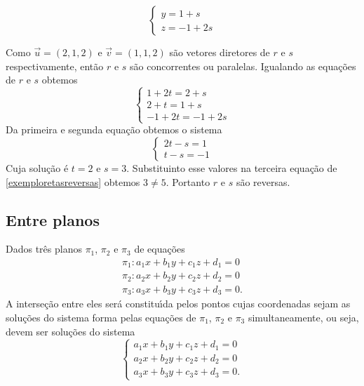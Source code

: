 \begin{exemplos}
\begin{enumerate}
\[\begin{cases}
                y = 1 + s\\
                z = -1 + 2s
            \end{cases}
        \]
        \begin{solucao}
            Como $\vec{u} = (2,1,2)$ e $\vec{v} = (1,1,2)$ s\~ao vetores diretores de $r$ e $s$ respectivamente, ent\~ao $r$ e $s$ s\~ao concorrentes ou paralelas. Igualando as equa\c{c}\~oes de $r$ e $s$ obtemos
            \begin{equation}\label{exemploretasreversas}
                \begin{cases}
                    1 + 2t = 2 + s\\
                    2 + t = 1 + s\\
                    -1 + 2t = -1 + 2s    
                \end{cases}
            \end{equation}
            Da primeira e segunda equação obtemos o sistema
            \[
                \begin{cases}
                    2t - s = 1\\
                    t - s = -1
                \end{cases}
            \]
            Cuja solução é $t = 2$ e $s = 3$. Substituinto esse valores na terceira equação de \eqref{exemploretasreversas} obtemos $3 \ne 5$. Portanto $r$ e $s$ s\~ao reversas.
        \end{solucao}
    \end{enumerate}
\end{exemplos}

\subsection{Entre planos} %
\label{sub:entre_planos}
Dados tr\^es planos $\pi_1$, $\pi_2$ e $\pi_3$ de equa\c{c}\~oes
\begin{align*}
    \pi_1 : a_1x + b_1y + c_1z + d_1 = 0\\
    \pi_2 : a_2x + b_2y + c_2z + d_2 = 0\\
    \pi_3 : a_3x + b_3y + c_3z + d_3 = 0.
\end{align*}
A interse\c{c}\~ao entre eles ser\'a constitu{\'\i}da pelos pontos cujas coordenadas sejam as solu\c{c}\~oes do sistema forma pelas equa\c{c}\~oes de $\pi_1$, $\pi_2$ e $\pi_3$ simultaneamente, ou seja, devem ser solu\c{c}\~oes do sistema
\[
    \begin{cases}
        a_1x + b_1y + c_1z + d_1 = 0\\
        a_2x + b_2y + c_2z + d_2 = 0\\
        a_3x + b_3y + c_3z + d_3 = 0.
    \end{cases}
\]

